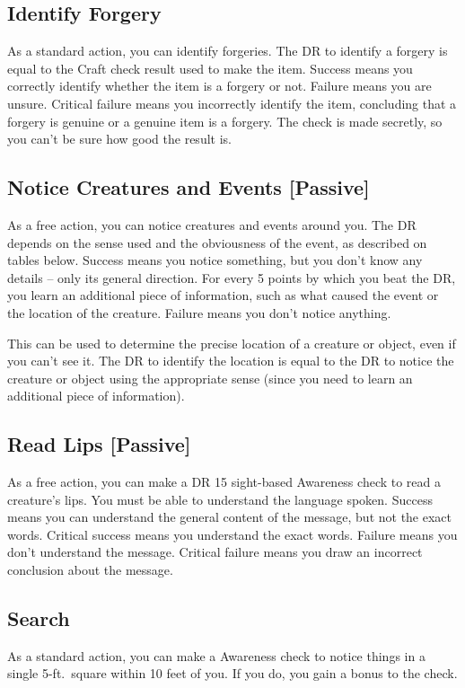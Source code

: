     \subsection{Identify Forgery}
        As a standard action, you can identify forgeries. The DR to identify a forgery is equal to the Craft check result used to make the item. Success means you correctly identify whether the item is a forgery or not. Failure means you are unsure. Critical failure means you incorrectly identify the item, concluding that a forgery is genuine or a genuine item is a forgery. The check is made secretly, so you can't be sure how good the result is.

    \subsection{Notice Creatures and Events [Passive]}
        As a free action, you can notice creatures and events around you. The DR depends on the sense used and the obviousness of the event, as described on tables below. Success means you notice something, but you don't know any details -- only its general direction. For every 5 points by which you beat the DR, you learn an additional piece of information, such as what caused the event or the location of the creature. Failure means you don't notice anything.

        This can be used to determine the precise location of a creature or object, even if you can't see it. The DR to identify the location is equal to the DR to notice the creature or object using the appropriate sense  (since you need to learn an additional piece of information).

    \subsection{Read Lips [Passive]}
        As a free action, you can make a DR 15 sight-based Awareness check to read a creature's lips. You must be able to understand the language spoken. Success means you can understand the general content of the message, but not the exact words. Critical success means you understand the exact words. Failure means you don't understand the message. Critical failure means you draw an incorrect conclusion about the message.

    \subsection{Search}\label{Search}
        As a standard action, you can make a Awareness check to notice things in a single 5-ft.\ square within 10 feet of you.
        If you do, you gain a  bonus to the check.

